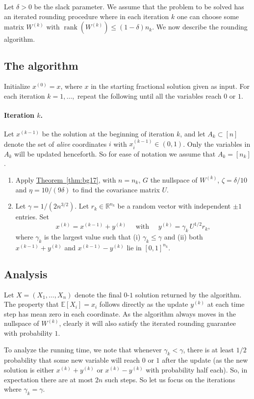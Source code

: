 \documentclass[11pt]{article}
\newcommand{\rank}{\operatorname{rank}}
\newcommand{\E}{\mathbb{E}}
\theoremstyle{definition}
\newcommand{\expref}[2]{\texorpdfstring{\hyperref[#2]{#1~\ref{#2}}}{#1~\ref{#2}}}
\newcommand{\R}{{\mathbb R}}
\begin{document}
%
%
%
%
%
%
%




Let $\delta>0$ be the slack parameter.
We assume that the problem to be solved has an iterated rounding procedure where in each iteration $k$ one can choose some matrix $W^{(k)}$ with $\rank(W^{(k)}) \leq (1-\delta) n_k$.
%
We now describe the rounding algorithm.
\subsection{The algorithm}
Initialize $x^{(0)}=x$, where $x$ in the starting fractional solution given as input.
For each iteration $k=1,\ldots,$ repeat the following until all the  variables reach $0$ or $1$.
\paragraph{Iteration $k$.} Let $x^{(k-1)}$ be the solution at the beginning of iteration $k$, and let $A_k \subset [n]$ denote the set of \emph{alive} coordinates $i$ with $x^{(k-1)}_i \in (0,1)$. 
Only the variables in $A_k$ will be updated henceforth. 
So for ease of notation we assume that $A_k = [n_k]$.
\begin{enumerate}
\item
Apply \expref{Theorem}{thm:bg17}, with $n=n_k$, $G$ the nullspace of $W^{(k)}$, $\zeta=\delta/10$ and $\eta= 10/(9\delta)$ to find the covariance matrix $U$.
\item  Let $\gamma = 1/(2n^{3/2})$. Let $r_k \in \R^{n_k}$ be a random vector with independent $\pm 1$ entries. Set
\[x^{(k)} = x^{(k-1)} +  y^{(k)}  \quad \text{ with } \quad y^{(k)} = \gamma_k \, U^{1/2} r_k,\] where
$\gamma_k$ is the largest value such that (i) $\gamma_k \leq \gamma $ and (ii) both
 $x^{(k-1)} + y^{(k)}$ and $x^{(k-1)} - y^{(k)}$ lie in  $[0,1]^{n_k}$.
\end{enumerate}

\subsection{Analysis}
Let $X = (X_1,\ldots,X_n)$ denote the final $0$-$1$ solution returned by the algorithm. The property that $\E[X_i]=x_i$ follows directly as the update $y^{(k)}$ at each time step has mean zero in each coordinate.
As the algorithm always moves in the nullspace of $W^{(k)}$, clearly it will also satisfy the
iterated rounding guarantee  with probability $1$.

To analyze the running time, we note that whenever $\gamma_k < \gamma$, there is at least $1/2$ probability that some new variable will reach $0$ or $1$ after the update (as the new solution is either $x^{(k)} + y^{(k)}$ or $x^{(k)} - y^{(k)}$ with probability half each). So, in expectation there are at most $2n$ such steps. So let us focus on the iterations where $\gamma_k =\gamma$.
\end{document}
